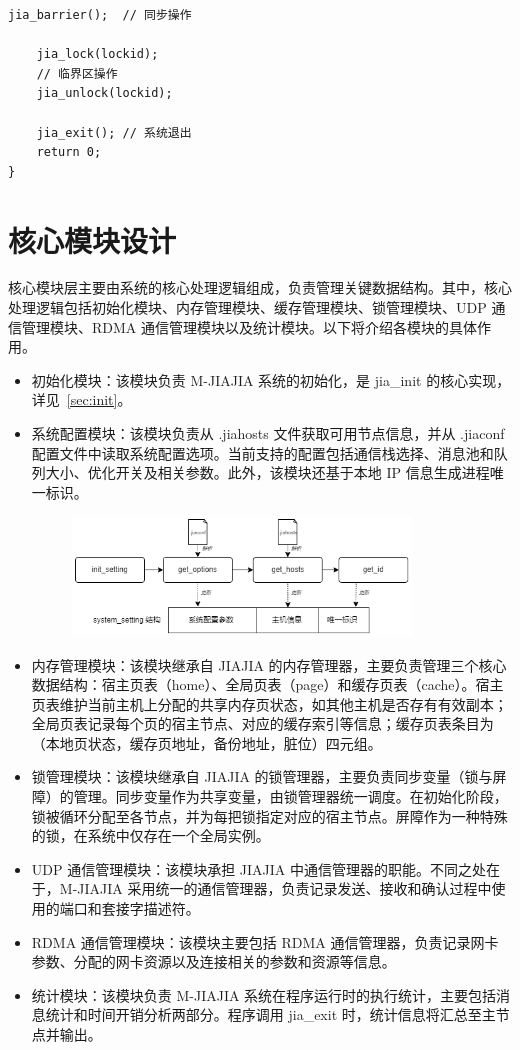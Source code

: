 {\begin{lstlisting}[style=CStyle, caption={M-JIAJIA 应用模板}, label={lst:jia-template}]
    jia_barrier();  // 同步操作    

    jia_lock(lockid);
    // 临界区操作
    jia_unlock(lockid);
    
    jia_exit(); // 系统退出
    return 0;
}
\end{lstlisting}
\section{核心模块设计}
核心模块层主要由系统的核心处理逻辑组成，负责管理关键数据结构。其中，核心处理逻辑包括初始化模块、内存管理模块、缓存管理模块、锁管理模块、UDP 通信管理模块、RDMA 通信管理模块以及统计模块。以下将介绍各模块的具体作用。
\begin{itemize}
    \item 初始化模块：该模块负责 M-JIAJIA 系统的初始化，是 jia\_init 的核心实现，详见~\ref{sec:init}。
    \item 系统配置模块：该模块负责从 .jiahosts 文件获取可用节点信息，并从 .jiaconf 配置文件中读取系统配置选项。当前支持的配置包括通信栈选择、消息池和队列大小、优化开关及相关参数。此外，该模块还基于本地 IP 信息生成进程唯一标识。
    \begin{figure}[!htbp]
        \centering
        \includegraphics[width=0.85\textwidth]{Img/system_setting.png}
        \label{fig:system-setting-module}
    \end{figure}
    
    \item 内存管理模块：该模块继承自 JIAJIA 的内存管理器，主要负责管理三个核心数据结构：宿主页表（home）、全局页表（page）和缓存页表（cache）。宿主页表维护当前主机上分配的共享内存页状态，如其他主机是否存有有效副本；全局页表记录每个页的宿主节点、对应的缓存索引等信息；缓存页表条目为（本地页状态，缓存页地址，备份地址，脏位）四元组。
    \item 锁管理模块：该模块继承自 JIAJIA 的锁管理器，主要负责同步变量（锁与屏障）的管理。同步变量作为共享变量，由锁管理器统一调度。在初始化阶段，锁被循环分配至各节点，并为每把锁指定对应的宿主节点。屏障作为一种特殊的锁，在系统中仅存在一个全局实例。
    \item UDP 通信管理模块：该模块承担 JIAJIA 中通信管理器的职能。不同之处在于，M-JIAJIA 采用统一的通信管理器，负责记录发送、接收和确认过程中使用的端口和套接字描述符。
    \item RDMA 通信管理模块：该模块主要包括 RDMA 通信管理器，负责记录网卡参数、分配的网卡资源以及连接相关的参数和资源等信息。
    \item 统计模块：该模块负责 M-JIAJIA 系统在程序运行时的执行统计，主要包括消息统计和时间开销分析两部分。程序调用 jia\_exit 时，统计信息将汇总至主节点并输出。
\end{itemize}
}
